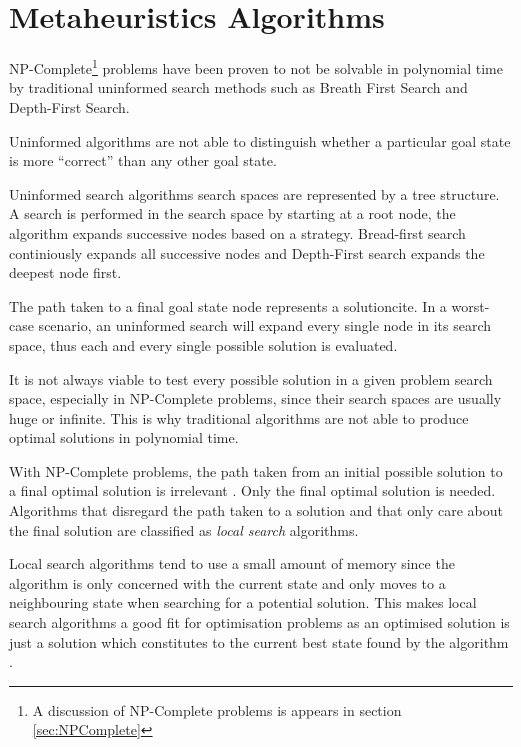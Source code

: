 \section{Metaheuristics Algorithms}
NP-Complete\footnote{A discussion of NP-Complete problems is appears in section \ref{sec:NPComplete}} problems have been proven to not be solvable in polynomial time by traditional uninformed search methods such as Breath First Search and Depth-First Search\cite{AIModernApproach}. 

Uninformed algorithms are not able to distinguish whether a particular goal state is more ``correct'' than any other goal state\cite{AIModernApproach}.

Uninformed search algorithms search spaces are represented by a tree structure\cite{AIModernApproach}. A search is performed in the search space by starting at a root node, the algorithm expands successive nodes based on a strategy\cite{AIModernApproach}. Bread-first search continiously expands all successive nodes and Depth-First search expands the deepest node first\cite{AIModernApproach}.

The path taken to a final  goal state node represents a solutioncite\cite{AIModernApproach}. In a worst-case scenario, an uninformed search will expand every single node in its search space, thus each and every single possible solution is evaluated\cite{AIModernApproach}.

It is not always viable to test every possible solution in a given problem search space, especially in NP-Complete problems, since their search spaces are usually huge or infinite. This is why traditional algorithms are not able to produce optimal solutions in polynomial time\cite{AIModernApproach}.

With NP-Complete problems, the path taken from an initial possible solution to a final optimal solution is irrelevant \cite{AIModernApproach}. Only the final optimal solution is needed. Algorithms that disregard the path taken to a solution and that only care about the final solution are classified as \emph{local search} algorithms\cite{AIModernApproach}.

Local search algorithms tend to use a small amount of memory since the algorithm is only concerned with the current state and only moves to a neighbouring state when searching for a potential solution. This makes local search algorithms a good fit for optimisation problems as an optimised solution is just a solution which constitutes to the current best state found by the algorithm \cite{AIModernApproach,NonlinearGlobalTabu}. 

